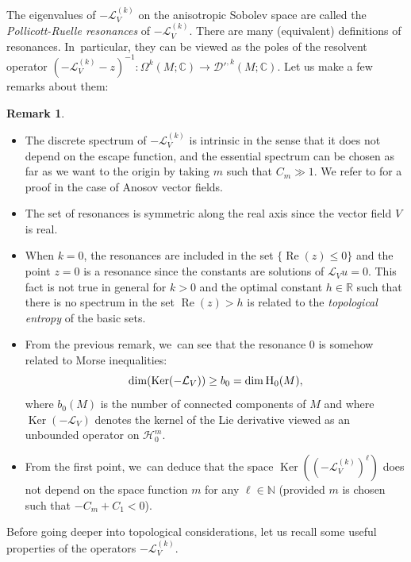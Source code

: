 \documentclass[JEP,XML,SOM,Unicode,NoEqCountersInSection,NoFloatCountersInSection,published]{cedram}
\theoremstyle{definition}
\newtheorem{remark}[definition]{Remark}
\theoremstyle{plain}
\newcommand{\C}{\mathbb{C}}
\newcommand{\D}{\mathcal{D}}
\newcommand{\Hil}{\mathcal{H}}
\newcommand{\Hsc}{\textsc{H}}
\newcommand{\Lie}{\mathcal{L}}
\newcommand{\N}{\mathbb{N}}
\newcommand{\R}{\mathbb{R}}
\DeclareMathOperator{\Ker}{Ker}
\DeclareMathOperator{\re}{Re}
\begin{document}
The eigenvalues of $-\Lie_V^{(k)}$ on the anisotropic Sobolev space are called the \textit{Pollicott-Ruelle resonances} of $-\Lie_V^{(k)}$. There are many (equivalent) definitions of resonances. In~particular, they can be viewed as the poles of the resolvent operator $(-\Lie_V^{(k)} - z)^{-1}: \Omega^k (M; \C) \to \D'^{,k} (M; \C)$. Let us make a few remarks about them:

\skpt
\begin{remark}
\begin{itemize}
\item The discrete spectrum of $-\Lie_V^{(k)}$ is intrinsic in the sense that it does not depend on the escape function, and the essential spectrum can be chosen as far as we want to the origin by taking $m$ such that $C_m \gg 1$. We refer to \cite[Th.\,1.5, p.\,134]{FS} for a proof in the case of Anosov vector fields.
\item The set of resonances is symmetric along the real axis since the vector field $V$ is real.
\item When $k = 0$, the resonances are included in the set $\{ \re (z) \leq 0 \}$ and the point $z = 0$ is a resonance since the constants are solutions of $\Lie_V u = 0$. This fact is not true in general for $k > 0$ and the optimal constant $h \in \R$ such that there is no spectrum in the set $\re (z) > h$ is related to the \textit{topological entropy} of the basic sets.
\item From the previous remark, we~can see that the resonance $0$ is somehow related to Morse inequalities:
\[
\dim (\Ker(-\Lie_V)) \geq b_0 = \dim \Hsc_0 (M),
\]
where $b_0(M)$ is the number of connected components of $M$ and where $\Ker (- \Lie_V)$ denotes the kernel of the Lie derivative viewed as an unbounded operator on $\Hil_0^m$.
\item From the first point, we~can deduce that the space $\Ker ((-\Lie_V^{(k)})^{\ell})$ does not depend on the space function $m$ for any $\ell \in \N$ (provided $m$ is chosen such that $-C_m+C_1<0$).
\end{itemize}
\end{remark}

Before going deeper into topological considerations, let us recall some useful properties of the operators $-\Lie_V^{(k)}$.
\end{document}
